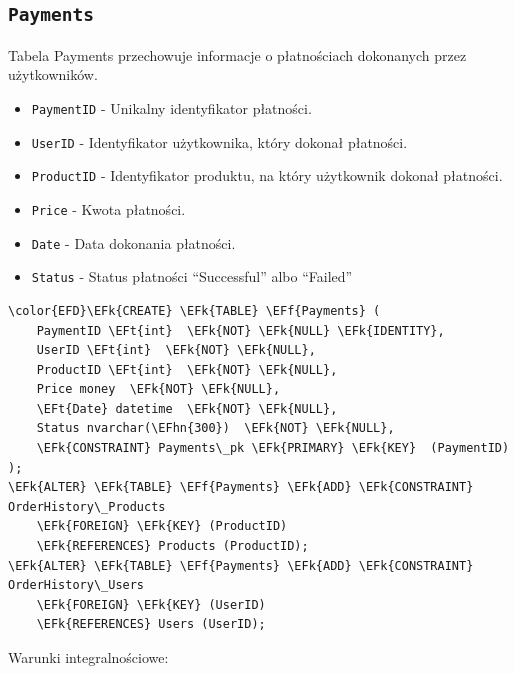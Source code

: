 \documentclass[11pt]{article}
\newcommand{\EFk}[1]{\textcolor{EFk}{\textbf{#1}}} %
\newcommand{\EFf}[1]{\textcolor{EFf}{#1}} %
\newcommand{\EFt}[1]{\textcolor{EFt}{\textbf{#1}}} %
\newcommand{\EFhn}[1]{\textcolor{EFhn}{#1}} %
\begin{document}
\subsection{\texttt{Payments}}
\label{sec:org32092b7}
Tabela Payments przechowuje informacje o płatnościach dokonanych przez użytkowników.
\begin{itemize}
\item \texttt{PaymentID} - Unikalny identyfikator płatności.
\item \texttt{UserID} - Identyfikator użytkownika, który dokonał płatności.
\item \texttt{ProductID} - Identyfikator produktu, na który użytkownik dokonał płatności.
\item \texttt{Price} - Kwota płatności.
\item \texttt{Date} - Data dokonania płatności.
\item \texttt{Status} - Status płatności ``Successful'' albo ``Failed''
\end{itemize}
\begin{Code}
\begin{Verbatim}
\color{EFD}\EFk{CREATE} \EFk{TABLE} \EFf{Payments} (
    PaymentID \EFt{int}  \EFk{NOT} \EFk{NULL} \EFk{IDENTITY},
    UserID \EFt{int}  \EFk{NOT} \EFk{NULL},
    ProductID \EFt{int}  \EFk{NOT} \EFk{NULL},
    Price money  \EFk{NOT} \EFk{NULL},
    \EFt{Date} datetime  \EFk{NOT} \EFk{NULL},
    Status nvarchar(\EFhn{300})  \EFk{NOT} \EFk{NULL},
    \EFk{CONSTRAINT} Payments\_pk \EFk{PRIMARY} \EFk{KEY}  (PaymentID)
);
\EFk{ALTER} \EFk{TABLE} \EFf{Payments} \EFk{ADD} \EFk{CONSTRAINT} OrderHistory\_Products
    \EFk{FOREIGN} \EFk{KEY} (ProductID)
    \EFk{REFERENCES} Products (ProductID);
\EFk{ALTER} \EFk{TABLE} \EFf{Payments} \EFk{ADD} \EFk{CONSTRAINT} OrderHistory\_Users
    \EFk{FOREIGN} \EFk{KEY} (UserID)
    \EFk{REFERENCES} Users (UserID);
\end{Verbatim}
\end{Code}
Warunki integralnościowe:
\end{document}

